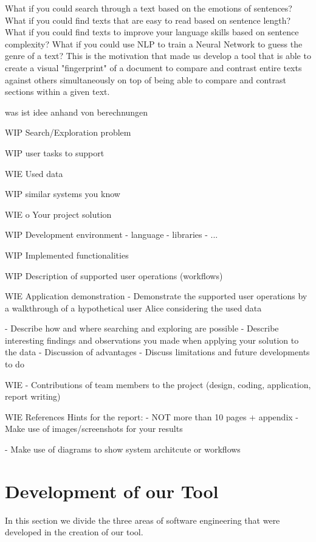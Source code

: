 \documentclass[runningheads]{llncs}
\begin{document}
What if you could search through a text based on the emotions of sentences? What if you could find texts that are easy to read based on sentence length? What if you could find texts to improve your language skills based on sentence complexity? What if you could use NLP to train a Neural Network to guess the genre of a text? This is the motivation that made us develop a tool that is able to create a visual "fingerprint" of a document to compare and contrast entire texts against others simultaneously on top of being able to compare and contrast sections within a given text.



was ist idee
anhand von berechnungen

WIP
Search/Exploration problem


WIP
user tasks to support

WIE
Used data

WIP
similar systems you know

WIE
o Your project solution

WIP
Development environment
- language
- libraries
- ...

WIP
Implemented functionalities

WIP
Description of supported user operations (workflows)

WIE
Application demonstration
- Demonstrate the supported user operations by a walkthrough of a hypothetical
user Alice considering the used data

- Describe how and where searching and exploring are possible
- Describe interesting findings and observations you made when applying your solution to the data
- Discussion of advantages
- Discuss limitations and future developments to do
           
WIE
- Contributions of team members to the project
(design, coding, application, report writing)

WIE
References Hints for the report:
- NOT more than 10 pages + appendix
- Make use of images/screenshots for your results

- Make use of diagrams to show system architcute or workflows



\newpage
\section{Development of our Tool}
In this section we divide the three areas of software engineering that were developed in the creation of our tool. 
\end{document}
